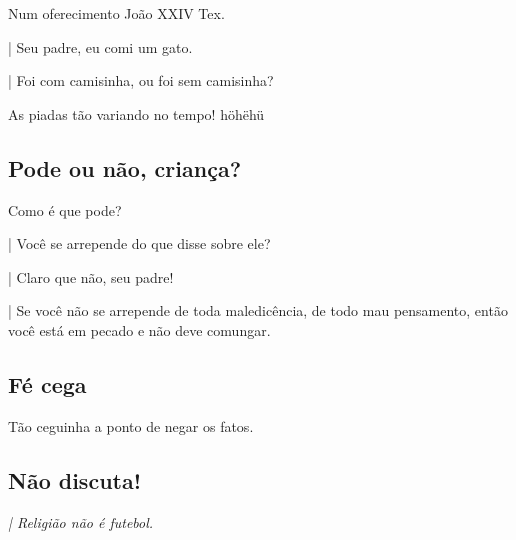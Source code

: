 \documentclass[12pt,a4paper]{article}
\begin{document}
			\begin{flushright}
			\end{flushright}

			Num oferecimento Jo\~ao XXIV Tex.

			\begin{flushright}
			\end{flushright}

| Seu padre, eu comi um gato.

| Foi com camisinha, ou foi sem camisinha?

As piadas t\~ao variando no tempo! h\"oh\"eh\"u

		\subsection{Pode ou n\~ao, crian\c{c}a?}\label{humorPode}
			\begin{flushright}
			\end{flushright}

			Como \'e que pode?

			\begin{flushright}
			\end{flushright}

| Voc\^e se arrepende do que disse sobre ele?

| Claro que n\~ao, seu padre!

| Se voc\^e n\~ao se arrepende de toda maledic\^encia, de todo mau pensamento, ent\~ao voc\^e est\'a em pecado e n\~ao deve comungar.

		\subsection{F\'e cega}
			\begin{flushright}
			\end{flushright}

			T\~ao ceguinha a ponto de negar os fatos.

			\begin{flushright}
			\end{flushright}

		\subsection{N\~ao discuta!}\label{naoSeDiscute}
			\begin{flushright}
			\end{flushright}

			\emph{| Religi\~ao n\~ao \'e futebol.}
\end{document}
